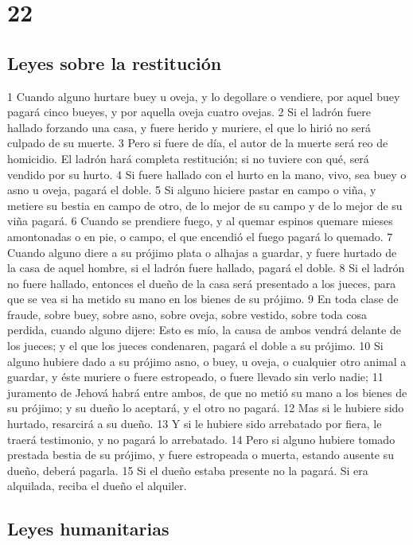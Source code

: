 \chapter{22}

\section*{Leyes sobre la restitución}

1 Cuando alguno hurtare buey u oveja, y lo degollare o vendiere, por aquel buey pagará cinco bueyes, y por aquella oveja cuatro ovejas.
2 Si el ladrón fuere hallado forzando una casa, y fuere herido y muriere, el que lo hirió no será culpado de su muerte.
3 Pero si fuere de día, el autor de la muerte será reo de homicidio. El ladrón hará completa restitución; si no tuviere con qué, será vendido por su hurto.
4 Si fuere hallado con el hurto en la mano, vivo, sea buey o asno u oveja, pagará el doble.
5 Si alguno hiciere pastar en campo o viña, y metiere su bestia en campo de otro, de lo mejor de su campo y de lo mejor de su viña pagará.
6 Cuando se prendiere fuego, y al quemar espinos quemare mieses amontonadas o en pie, o campo, el que encendió el fuego pagará lo quemado.
7 Cuando alguno diere a su prójimo plata o alhajas a guardar, y fuere hurtado de la casa de aquel hombre, si el ladrón fuere hallado, pagará el doble.
8 Si el ladrón no fuere hallado, entonces el dueño de la casa será presentado a los jueces, para que se vea si ha metido su mano en los bienes de su prójimo.
9 En toda clase de fraude, sobre buey, sobre asno, sobre oveja, sobre vestido, sobre toda cosa perdida, cuando alguno dijere: Esto es mío, la causa de ambos vendrá delante de los jueces; y el que los jueces condenaren, pagará el doble a su prójimo.
10 Si alguno hubiere dado a su prójimo asno, o buey, u oveja, o cualquier otro animal a guardar, y éste muriere o fuere estropeado, o fuere llevado sin verlo nadie;
11 juramento de Jehová habrá entre ambos, de que no metió su mano a los bienes de su prójimo; y su dueño lo aceptará, y el otro no pagará.
12 Mas si le hubiere sido hurtado, resarcirá a su dueño.
13 Y si le hubiere sido arrebatado por fiera, le traerá testimonio, y no pagará lo arrebatado.
14 Pero si alguno hubiere tomado prestada bestia de su prójimo, y fuere estropeada o muerta, estando ausente su dueño, deberá pagarla.
15 Si el dueño estaba presente no la pagará. Si era alquilada, reciba el dueño el alquiler.

\section*{Leyes humanitarias}

